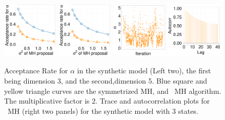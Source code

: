   \begin{figure}[H]
  \centering
  \begin{minipage}[!hp]{0.99\linewidth}
    \includegraphics [width=0.24\textwidth, angle=0]{figs/acc/EXP_D3alpha_k2.pdf}
    \includegraphics [width=0.24\textwidth, angle=0]{figs/acc/EXP_D5alpha_k2.pdf}
    \includegraphics [width=0.24\textwidth, angle=0]{figs/exp_ks/exp_traceoMH_7_05_3_.pdf}
    \includegraphics [width=0.24\textwidth, angle=0]{figs/exp_ks/exp_omhacf_7_05_3_.pdf}
  \end{minipage}
    \caption{Acceptance Rate for $\alpha$ in the synthetic model (Left two), the first being dimension 3, and the second,dimension 5. Blue square and yellow triangle curves are the symmetrized MH, and \naive\ MH  algorithm. The multiplicative factor is $2$. Trace and autocorrelation plots for \naive\ MH  (right two panels) for the synthetic model with $3$ states.}
     \label{fig:ACC_EXP}
  \end{figure}

